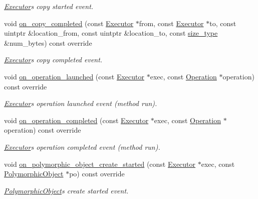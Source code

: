 \begin{DoxyCompactItemize}
\begin{DoxyCompactList}\small\item\em \hyperlink{classgko_1_1Executor}{Executor}\textquotesingle{}s copy started event. \end{DoxyCompactList}\item 
void \hyperlink{classgko_1_1log_1_1Record_a38e2969938c346ae1e7df52c79d30e07}{on\+\_\+copy\+\_\+completed} (const \hyperlink{classgko_1_1Executor}{Executor} $\ast$from, const \hyperlink{classgko_1_1Executor}{Executor} $\ast$to, const uintptr \&location\+\_\+from, const uintptr \&location\+\_\+to, const \hyperlink{namespacegko_a6e5c95df0ae4e47aab2f604a22d98ee7}{size\+\_\+type} \&num\+\_\+bytes) const override
\begin{DoxyCompactList}\small\item\em \hyperlink{classgko_1_1Executor}{Executor}\textquotesingle{}s copy completed event. \end{DoxyCompactList}\item 
void \hyperlink{classgko_1_1log_1_1Record_ae6557085190b7d18419e08d4da3de7c7}{on\+\_\+operation\+\_\+launched} (const \hyperlink{classgko_1_1Executor}{Executor} $\ast$exec, const \hyperlink{classgko_1_1Operation}{Operation} $\ast$operation) const override
\begin{DoxyCompactList}\small\item\em \hyperlink{classgko_1_1Executor}{Executor}\textquotesingle{}s operation launched event (method run). \end{DoxyCompactList}\item 
void \hyperlink{classgko_1_1log_1_1Record_af5c3f24742e70415e5af72f3f8e4e8ef}{on\+\_\+operation\+\_\+completed} (const \hyperlink{classgko_1_1Executor}{Executor} $\ast$exec, const \hyperlink{classgko_1_1Operation}{Operation} $\ast$operation) const override
\begin{DoxyCompactList}\small\item\em \hyperlink{classgko_1_1Executor}{Executor}\textquotesingle{}s operation completed event (method run). \end{DoxyCompactList}\item 
void \hyperlink{classgko_1_1log_1_1Record_a3def7ea0736331d84be5c14235a8e16b}{on\+\_\+polymorphic\+\_\+object\+\_\+create\+\_\+started} (const \hyperlink{classgko_1_1Executor}{Executor} $\ast$exec, const \hyperlink{classgko_1_1PolymorphicObject}{Polymorphic\+Object} $\ast$po) const override
\begin{DoxyCompactList}\small\item\em \hyperlink{classgko_1_1PolymorphicObject}{Polymorphic\+Object}\textquotesingle{}s create started event. \end{DoxyCompactList}\item 

\end{DoxyCompactItemize}
